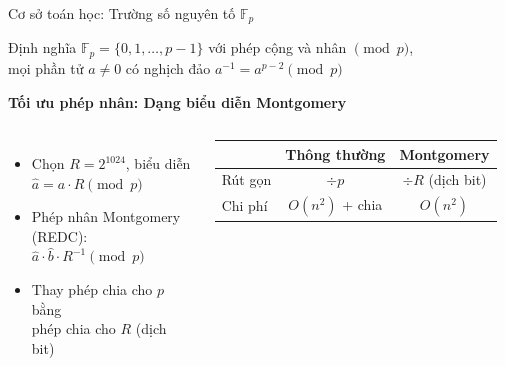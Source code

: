 \begin{frame}[label=sec2]{Cơ sở toán học: Trường số nguyên tố $\mathbb{F}_p$}
  \begin{block}{Định nghĩa}
    $\mathbb{F}_p = \{0,1,\ldots,p{-}1\}$ với phép cộng và nhân $\pmod{p}$,\\
    mọi phần tử $a \neq 0$ có nghịch đảo $a^{-1} = a^{p-2} \pmod{p}$
  \end{block}
  \vspace{0.5em}
  \textbf{Tối ưu phép nhân: Dạng biểu diễn Montgomery}
  \begin{columns}[c]
      \begin{itemize}
        \item Chọn $R = 2^{1024}$, biểu diễn $\hat{a} = a \cdot R \pmod{p}$
        \item Phép nhân Montgomery (REDC):\\
              $\hat{a} \cdot \hat{b} \cdot R^{-1} \pmod{p}$
        \item Thay phép chia cho $p$ bằng\\phép chia cho $R$ (dịch bit)
      \end{itemize}
      \begin{table}
        \small
        \begin{tabular}{lcc}
          \toprule
          & Thông thường & Montgomery \\
          \midrule
          Rút gọn & $\div p$ & $\div R$ (dịch bit) \\
          Chi phí & $O(n^2)$ + chia & $O(n^2)$ \\
          \bottomrule
        \end{tabular}
      \end{table}
  \end{columns}
\end{frame}
